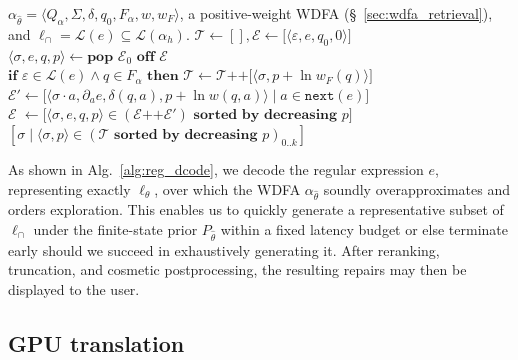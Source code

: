 \documentclass[popl.tex]{subfiles}
\begin{document}
\begin{algorithm}[H]
  \caption{\texttt{reg\_dcode} pseudocode}
  \label{alg:reg_dcode}
  \begin{algorithmic}[1]
  \Require $\alpha_{\hat\theta}=\langle Q_\alpha,\Sigma,\delta,q_0,F_\alpha,w,w_F\rangle$, a positive-weight WDFA (\S~\ref{sec:wdfa_retrieval}), and $\ell_\cap=\mathcal{L}(e)\subseteq\mathcal{L}(\alpha_h)$.
    \State $\mathcal{T} \gets [], \mathcal{E} \gets \big[\langle \varepsilon, e, q_0, 0\rangle\big]$ 
    \Repeat
        \State $\langle\sigma, e, q, p\rangle \gets \textbf{pop } \mathcal{E}_0 \textbf{ off }\mathcal{E}$ 
        \State $\textbf{if } \varepsilon \in \mathcal{L}(e) \land q \in F_\alpha \textbf{ then } \mathcal{T} \gets \mathcal{T} \texttt{++} \big[\langle \sigma, p + \ln w_F(q) \rangle\big]$
        \State $\mathcal{E}' \gets \big[\langle\sigma\cdot a, \partial_a e, \delta(q,a), p + \ln w(q,a) \rangle \mid a \in \texttt{next}(e)\big]$
        \State $\mathcal{E}\phantom{'} \gets \big[\langle\sigma, e, q, p\rangle \in (\mathcal{E} \texttt{++} \mathcal{E}')\textbf{ sorted by decreasing } p\big]$
    \State \Return $[\sigma \mid \langle\sigma, p\rangle \in (\mathcal{T}\textbf{ sorted by decreasing } p)_{0..k}]$ 
\EndProcedure
  \end{algorithmic}
\end{algorithm}

\noindent As shown in Alg.~\ref{alg:reg_dcode}, we decode the regular expression $e$, representing exactly $\ell_\theta$, over which the WDFA $\alpha_{\hat\theta}$ soundly overapproximates and orders exploration. This enables us to quickly generate a representative subset of $\ell_\cap$ under the finite-state prior $P_{\hat\theta}$ within a fixed latency budget or else terminate early should we succeed in exhaustively generating it. After reranking, truncation, and cosmetic postprocessing, the resulting repairs may then be displayed to the user.

\clearpage\subsection{GPU translation}\label{sec:gpu_translation}
\end{document}
